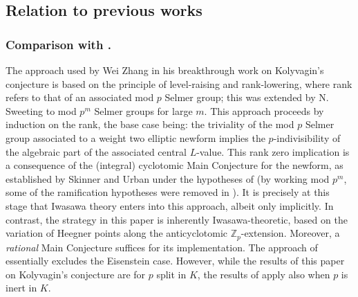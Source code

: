 \documentclass[10pt,reqno]{amsart}
\numberwithin{equation}{section}
\theoremstyle{plain}
\theoremstyle{definition}
\theoremstyle{definition}
\theoremstyle{plain}
\theoremstyle{plain}
\theoremstyle{plain}
\theoremstyle{plain}
\theoremstyle{plain}
\theoremstyle{plain}
\newcommand{\Z}{\mathbb{Z}}
\newcommand{\bkappa}{\boldsymbol{\kappa}}
\begin{document}

\subsection{Relation to previous works}

\subsubsection*{Comparison with \cite{zhang_ind,sweeting}.} The approach used by Wei Zhang in his breakthrough work on Kolyvagin's conjecture is based on the principle of level-raising and rank-lowering, where rank refers to that of an associated mod $p$ Selmer group; this was extended by N.\,Sweeting to mod $p^m$ Selmer groups for large $m$. This approach proceeds by induction on the rank, the base case being: the triviality of the mod $p$ Selmer group associated to a weight two elliptic newform implies the $p$-indivisibility of the algebraic part of the associated central $L$-value. This rank zero 
implication 
is a consequence of the (integral) cyclotomic Main Conjecture for the newform, as established by Skinner and Urban \cite{skinner-urban} under the hypotheses of \cite{zhang_ind} (by working mod $p^m$, some of the ramification hypotheses %
were removed in \cite{sweeting}). It is precisely at this stage that Iwasawa theory enters into this approach, 
albeit only implicitly. In contrast, %
the strategy in this paper is inherently Iwasawa-theoretic, based on the variation of Heegner points along the anticyclotomic $\Z_p$-extension. 
Moreover, a {\em rational} Main Conjecture suffices for its implementation. 
The approach of \cite{zhang_ind,sweeting} essentially excludes the Eisenstein case. 
However, while the results of this paper on Kolyvagin's conjecture are for $p$ split in $K$, the results of \cite{zhang_ind,sweeting} apply also when $p$ is inert in $K$.
\end{document}
